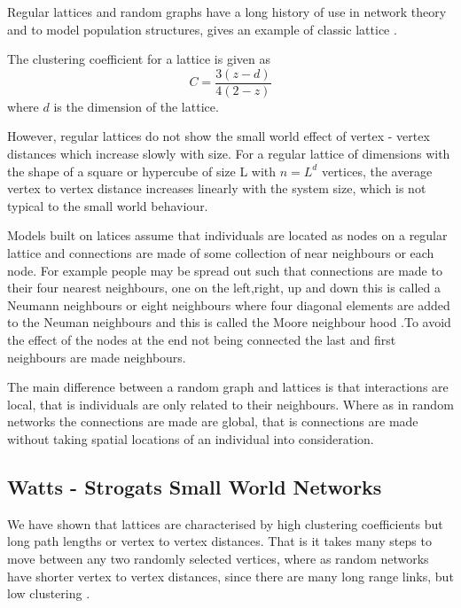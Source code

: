 
Regular lattices and random graphs have a long history of use in network theory and to model population structures,  gives an example of classic lattice \citep{harris1974contact}.

The clustering coefficient for a lattice is given as  
\begin{equation}
C = \frac{3(z -d)}{4(2-z)}
\end{equation}
where $d$ is the dimension of the lattice.

However, regular lattices do not show the small world effect of vertex - vertex distances which increase slowly with size. For a regular lattice of dimensions with the shape of a square or hypercube of size L with $n = L^d$ vertices, the average vertex to vertex distance increases linearly with the system size, which is not typical to the small world behaviour. 


 Models built on latices assume that individuals are located as nodes on a regular lattice and connections are made of some collection of near neighbours or each node. For example people may be spread out such that connections are made to their four nearest neighbours, one on the left,right, up and down this is called a Neumann neighbours  or eight neighbours where four diagonal elements are added to the Neuman neighbours and this is called the Moore neighbour hood \citep{lloyd2006infection}.To avoid the effect of the nodes at the end not being connected the last and first neighbours are made neighbours.

The main difference between a random graph and lattices is that interactions are local, that is individuals are only related to their neighbours. Where as in random networks the connections are made are global, that is connections are made without taking spatial locations of an individual into consideration. 

\subsection{Watts - Strogats Small World Networks}
We have shown that lattices are characterised by high clustering coefficients but long path lengths or vertex to vertex distances. That is it takes many steps to move between any two randomly selected vertices, where as random networks have shorter vertex to vertex distances, since there are many long range links, but low clustering \citep{keeling2005networks}.


